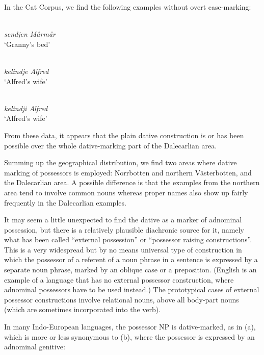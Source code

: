 {%
In the Cat Corpus, we find the following examples without overt case-marking:

\ea 
\ea 
{}\\
\gl \textit{sendjen Mårmår}\\
\glt ‘Granny’s bed’

\ex 
{}\\
\gl \textit{kelindje Alfred}\\
\glt ‘Alfred’s wife’

\ex 
{}\\
\gl \textit{kelindji Alfred}\\
\glt ‘Alfred’s wife’

\z 
\z



From these data, it appears that the plain dative construction is or has been possible over the whole dative-marking part of the Dalecarlian area. 

Summing up the geographical distribution, we find two areas where dative marking of possessors is employed: Norrbotten and northern Västerbotten, and the Dalecarlian area. A possible difference is that the examples from the northern area tend to involve common nouns whereas proper names also show up fairly frequently in the Dalecarlian examples. 

It may seem a little unexpected to find the dative as a marker of adnominal possession, but there is a relatively plausible diachronic source for it, namely what has been called “external possession” or “possessor raising constructions”. This is a very widespread but by no means universal type of construction in which the possessor of a referent of a noun phrase in a sentence is expressed by a separate noun phrase, marked by an oblique case or a preposition. (English is an example of a language that has no external possessor construction, where adnominal possessors have to be used instead.) The prototypical cases of external possessor constructions involve relational nouns, above all body-part nouns (which are sometimes incorporated into the verb).

In many Indo-European languages, the possessor NP is dative-marked, as in (a), which is more or less synonymous to (b), where the possessor is expressed by an adnominal genitive:

}
